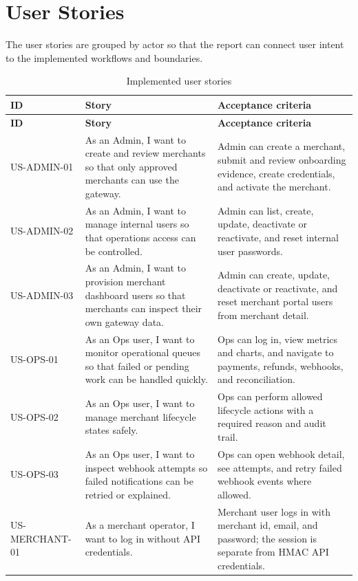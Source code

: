 \chapter{User Stories}

The user stories are grouped by actor so that the report can connect user
intent to the implemented workflows and boundaries.

\begin{longtable}{L{0.17\textwidth}L{0.37\textwidth}L{0.36\textwidth}}
\caption{Implemented user stories}\\
\toprule
\textbf{ID} & \textbf{Story} & \textbf{Acceptance criteria} \\
\midrule
\endfirsthead
\toprule
\textbf{ID} & \textbf{Story} & \textbf{Acceptance criteria} \\
\midrule
\endhead
US-ADMIN-01 & As an Admin, I want to create and review merchants so that only approved merchants can use the gateway. & Admin can create a merchant, submit and review onboarding evidence, create credentials, and activate the merchant. \\
\bodyrowrule
US-ADMIN-02 & As an Admin, I want to manage internal users so that operations access can be controlled. & Admin can list, create, update, deactivate or reactivate, and reset internal user passwords. \\
\bodyrowrule
US-ADMIN-03 & As an Admin, I want to provision merchant dashboard users so that merchants can inspect their own gateway data. & Admin can create, update, deactivate or reactivate, and reset merchant portal users from merchant detail. \\
\bodyrowrule
US-OPS-01 & As an Ops user, I want to monitor operational queues so that failed or pending work can be handled quickly. & Ops can log in, view metrics and charts, and navigate to payments, refunds, webhooks, and reconciliation. \\
\bodyrowrule
US-OPS-02 & As an Ops user, I want to manage merchant lifecycle states safely. & Ops can perform allowed lifecycle actions with a required reason and audit trail. \\
\bodyrowrule
US-OPS-03 & As an Ops user, I want to inspect webhook attempts so failed notifications can be retried or explained. & Ops can open webhook detail, see attempts, and retry failed webhook events where allowed. \\
\bodyrowrule
US-MERCHANT-01 & As a merchant operator, I want to log in without API credentials. & Merchant user logs in with merchant id, email, and password; the session is separate from HMAC API credentials. \\

\end{longtable}
